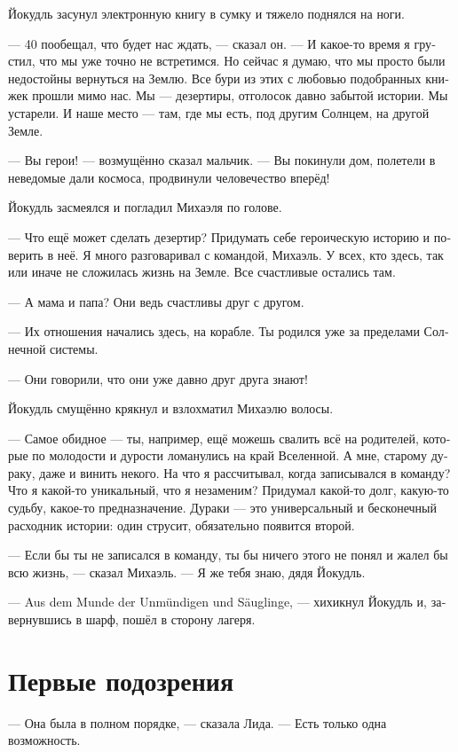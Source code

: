 \documentclass[a4paper,12pt,fleqn]{book}\usepackage{polyglossia}\setdefaultlanguage[babelshorthands=true]{russian}\setotherlanguage{english}\defaultfontfeatures{Ligatures=TeX,Mapping=tex-text}\usepackage{xcolor}\newcommand{\ml}[3]{#2}
\begin{document}
Йокудль засунул электронную книгу в сумку и тяжело поднялся на ноги.

--- 40 пообещал, что будет нас ждать, --- сказал он.
--- И какое-то время я грустил, что мы уже точно не встретимся.
Но сейчас я думаю, что мы просто были недостойны вернуться на Землю.
Все бури из этих с любовью подобранных книжек прошли мимо нас.
Мы --- дезертиры, отголосок давно забытой истории.
Мы устарели.
И наше место --- там, где мы есть, под другим Солнцем, на другой Земле.

--- Вы герои! --- возмущённо сказал мальчик.
--- Вы покинули дом, полетели в неведомые дали космоса, продвинули человечество вперёд!

Йокудль засмеялся и погладил Михаэля по голове.

--- Что ещё может сделать дезертир?
Придумать себе героическую историю и поверить в неё.
Я много разговаривал с командой, Михаэль.
У всех, кто здесь, так или иначе не сложилась жизнь на Земле.
Все счастливые остались там.

--- А мама и папа?
Они ведь счастливы друг с другом.

--- Их отношения начались здесь, на корабле.
Ты родился уже за пределами Солнечной системы.

--- Они говорили, что они уже давно друг друга знают!

Йокудль смущённо крякнул и взлохматил Михаэлю волосы.

--- Самое обидное --- ты, например, ещё можешь свалить всё на родителей, которые по молодости и дурости ломанулись на край Вселенной.
А мне, старому дураку, даже и винить некого.
На что я рассчитывал, когда записывался в команду?
Что я какой-то уникальный, что я незаменим?
Придумал какой-то долг, какую-то судьбу, какое-то предназначение.
Дураки --- это универсальный и бесконечный расходник истории: один струсит, обязательно появится второй.

--- Если бы ты не записался в команду, ты бы ничего этого не понял и жалел бы всю жизнь, --- сказал Михаэль.
--- Я же тебя знаю, дядя Йокудль.

--- Aus dem Munde der Unmündigen und Säuglinge, --- хихикнул Йокудль и, завернувшись в шарф, пошёл в сторону лагеря.

\section{Первые подозрения}

--- Она была в полном порядке, --- сказала Лида.
--- Есть только одна возможность.
\end{document}
